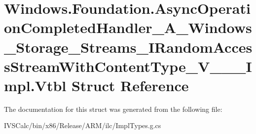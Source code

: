 \hypertarget{struct_windows_1_1_foundation_1_1_async_operation_completed_handler___a___windows___storage___stb2e8fcb8353c0c8b756f19b05aa113af}{}\section{Windows.\+Foundation.\+Async\+Operation\+Completed\+Handler\+\_\+\+A\+\_\+\+Windows\+\_\+\+Storage\+\_\+\+Streams\+\_\+\+I\+Random\+Access\+Stream\+With\+Content\+Type\+\_\+\+V\+\_\+\+\_\+\+\_\+\+Impl.\+Vtbl Struct Reference}
\label{struct_windows_1_1_foundation_1_1_async_operation_completed_handler___a___windows___storage___stb2e8fcb8353c0c8b756f19b05aa113af}


The documentation for this struct was generated from the following file\+:\begin{DoxyCompactItemize}
\item 
I\+V\+S\+Calc/bin/x86/\+Release/\+A\+R\+M/ilc/Impl\+Types.\+g.\+cs\end{DoxyCompactItemize}
